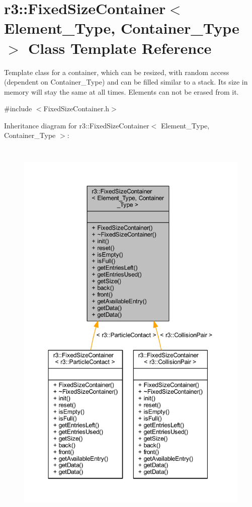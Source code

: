 \hypertarget{classr3_1_1_fixed_size_container}{}\section{r3\+:\+:Fixed\+Size\+Container$<$ Element\+\_\+\+Type, Container\+\_\+\+Type $>$ Class Template Reference}
\label{classr3_1_1_fixed_size_container}


Template class for a container, which can be resized, with random access (dependent on Container\+\_\+\+Type) and can be filled similar to a stack. Its size in memory will stay the same at all times. Elements can not be erased from it.  




{\ttfamily \#include $<$Fixed\+Size\+Container.\+h$>$}



Inheritance diagram for r3\+:\+:Fixed\+Size\+Container$<$ Element\+\_\+\+Type, Container\+\_\+\+Type $>$\+:\nopagebreak
\begin{figure}[H]
\begin{center}
\leavevmode
\includegraphics[height=550pt]{classr3_1_1_fixed_size_container__inherit__graph}
\end{center}
\end{figure}


